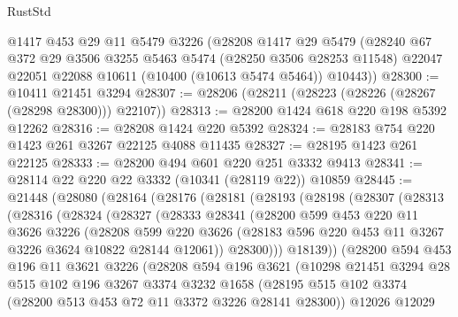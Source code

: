 \begin{lexlean}{RustStd}
\begin{coremodule}
    @1417
    @453
    @29
    @11
    @5479
    @3226
    (@28208
      @1417
      @29
      @5479
      (@28240
        @67
        @372
        @29
        @3506
        @3255
        @5463
        @5474
        (@28250 @3506 @28253 @11548)
        @22047
        @22051
        @22088
        @10611
        (@10400 (@10613 @5474 @5464))
        @10443))
@28300 := @10411 @21451 @3294
@28307 := @28206 (@28211 (@28223 (@28226 (@28267 (@28298 @28300))) @22107))
@28313 := @28200 @1424 @618 @220 @198 @5392 @12262
@28316 := @28208 @1424 @220 @5392
@28324 := @28183 @754 @220 @1423 @261 @3267 @22125 @4088 @11435
@28327 := @28195 @1423 @261 @22125
@28333 := @28200 @494 @601 @220 @251 @3332 @9413
@28341 := @28114 @22 @220 @22 @3332 (@10341 (@28119 @22)) @10859
@28445 := @21448
    (@28080
      (@28164
        (@28176
          (@28181
            (@28193
              (@28198
                (@28307
                  (@28313
                    (@28316
                      (@28324
                        (@28327
                          (@28333
                            @28341
                            (@28200
                              @599
                              @453
                              @220
                              @11
                              @3626
                              @3226
                              (@28208
                                @599
                                @220
                                @3626
                                (@28183 @596 @220 @453 @11 @3267 @3226 @3624 @10822 @28144 @12061))
                              @28300)))
                        @18139))
                    (@28200
                      @594
                      @453
                      @196
                      @11
                      @3621
                      @3226
                      (@28208
                        @594
                        @196
                        @3621
                        (@10298
                          @21451
                          @3294
                          @28
                          @515
                          @102
                          @196
                          @3267
                          @3374
                          @3232
                          @1658
                          (@28195
                            @515
                            @102
                            @3374
                            (@28200 @513 @453 @72 @11 @3372 @3226 @28141 @28300))
                          @12026
                          @12029

\end{coremodule}
\end{lexlean}
